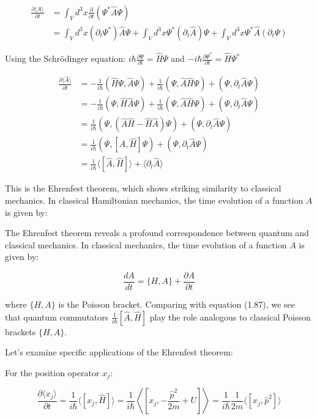 \documentclass[10pt]{article}
\begin{document}
\begin{align*}
\frac{\partial\langle\hat{A}\rangle}{\partial t} &= \int_V d^3x\frac{\partial}{\partial t}(\Psi^*\hat{A}\Psi) \\
&= \int_V d^3x(\partial_t\Psi^*)\hat{A}\Psi + \int_V d^3x\Psi^*(\partial_t\hat{A})\Psi + \int_V d^3x\Psi^*\hat{A}(\partial_t\Psi) \tag{1.86}
\end{align*}

Using the Schrödinger equation:
$i\hbar\frac{\partial\Psi}{\partial t} = \hat{H}\Psi$ and $-i\hbar\frac{\partial\Psi^*}{\partial t} = \hat{H}\Psi^*$

\begin{align*}
\frac{\partial\langle\hat{A}\rangle}{\partial t} &= -\frac{1}{i\hbar}(\hat{H}\Psi, \hat{A}\Psi) + \frac{1}{i\hbar}(\Psi, \hat{A}\hat{H}\Psi) + (\Psi, \partial_t\hat{A}\Psi) \\
&= -\frac{1}{i\hbar}(\Psi, \hat{H}\hat{A}\Psi) + \frac{1}{i\hbar}(\Psi, \hat{A}\hat{H}\Psi) + (\Psi, \partial_t\hat{A}\Psi) \\
&= \frac{1}{i\hbar}(\Psi, (\hat{A}\hat{H} - \hat{H}\hat{A})\Psi) + (\Psi, \partial_t\hat{A}\Psi) \tag{1.87} \\
&= \frac{1}{i\hbar}(\Psi, [\hat{A}, \hat{H}]\Psi) + (\Psi, \partial_t\hat{A}\Psi) \\
&= \frac{1}{i\hbar}\langle[\hat{A}, \hat{H}]\rangle + \langle\partial_t\hat{A}\rangle
\end{align*}

This is the Ehrenfest theorem, which shows striking similarity to classical mechanics. In classical Hamiltonian mechanics, the time evolution of a function $A$ is given by:


The Ehrenfest theorem reveals a profound correspondence between quantum and classical mechanics. In classical mechanics, the time evolution of a function $A$ is given by:

\begin{equation*}
\frac{dA}{dt} = \{H,A\} + \frac{\partial A}{\partial t} \tag{1.88}
\end{equation*}

where $\{H,A\}$ is the Poisson bracket. Comparing with equation (1.87), we see that quantum commutators $\frac{1}{i\hbar}[\hat{A},\hat{H}]$ play the role analogous to classical Poisson brackets $\{H,A\}$.

Let's examine specific applications of the Ehrenfest theorem:

For the position operator $x_j$:

\begin{equation*}
\frac{\partial\langle x_j\rangle}{\partial t} = \frac{1}{i\hbar}\langle[x_j,\hat{H}]\rangle = \frac{1}{i\hbar}\left\langle\left[x_j,-\frac{\hat{p}^2}{2m}+U\right]\right\rangle = \frac{1}{i\hbar}\frac{1}{2m}\langle[x_j,\hat{p}^2]\rangle \tag{1.89}
\end{equation*}
\end{document}
